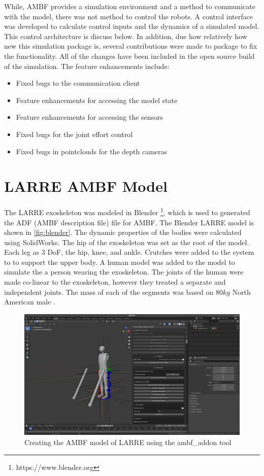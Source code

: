  While, AMBF provides a simulation environment and a method to communicate with the model, there was not method to control the robots. A control interface was developed to calculate control inputs and the dynamics of a simulated model. This control architecture is discuss below. In addition, due how relatively how new this simulation package is, several contributions were made to package to fix the functionality. All of the changes have been included in the open source build of the simulation. The feature enhancements include:
 \begin{itemize}
     \item Fixed bugs to the communication client
     \item Feature enhancements for accessing the model state
     \item Feature enhancements for accessing the sensors 
     \item Fixed bugs for the joint effort control
     \item Fixed bugs in pointclouds for the depth cameras
 \end{itemize}
 
 \section{LARRE AMBF Model}
 
 The LARRE exoskeleton was modeled in Blender \footnote{https://www.blender.org}, which is used to generated the ADF (AMBF description file) file for AMBF. The Blender LARRE model is shown in \autoref{fig:blender}. The dynamic properties of the bodies were calculated using SolidWorks. The hip of the exoskeleton was set as the root of the model. Each leg as 3 DoF, the hip, knee, and ankle. Crutches were added to the system to to support the upper body. A human model was added to the model to simulate the a person wearing the exoskeleton. The joints of the human were made co-linear to the exoskeleton, however they treated a separate and independent joints. The mass of each of the segments was based on $80kg$ North American male \cite{BMI} \cite{drillis1964body}.
 
 \begin{figure}[h]
     \centering
     \includegraphics[scale=0.2]{images/sim/blender.png}
     \caption[Blender Model of LARRE]{Creating the AMBF model of LARRE using the ambf\_addon tool}
     \label{fig:blender}
 \end{figure}
 

